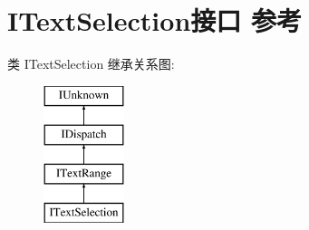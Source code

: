 \hypertarget{interface_i_text_selection}{}\section{I\+Text\+Selection接口 参考}
\label{interface_i_text_selection}
类 I\+Text\+Selection 继承关系图\+:\begin{figure}[H]
\begin{center}
\leavevmode
\includegraphics[height=4.000000cm]{interface_i_text_selection}
\end{center}
\end{figure}
